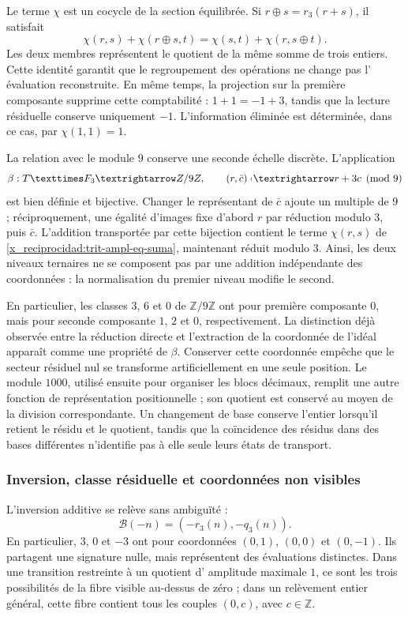 Le terme \(\chi\) est un cocycle de la section équilibrée. Si
\(r\oplus s=r_3(r+s)\), il satisfait
\[
 \chi(r,s)+\chi(r\oplus s,t)
 =\chi(s,t)+\chi(r,s\oplus t).
\]
Les deux membres représentent le quotient de la même somme de trois entiers.
Cette identité garantit que le regroupement des opérations ne change pas l'
évaluation reconstruite. En même temps, la projection sur la première
composante supprime cette comptabilité : \(1+1=-1+3\), tandis que la lecture
résiduelle conserve uniquement \(-1\). L'information éliminée est
déterminée, dans ce cas, par \(\chi(1,1)=1\).

La relation avec le module \(9\) conserve une seconde échelle discrète. L'application
\[
 \beta:\TRIT\times\mathbb F_3\longrightarrow\mathbb Z/9\mathbb Z,
 \qquad (r,\bar c)\longmapsto r+3c\pmod9
\]
est bien définie et bijective. Changer le représentant de \(\bar c\) ajoute un multiple de \(9\) ; réciproquement, une égalité d'images fixe d'abord \(r\) par réduction modulo \(3\), puis \(\bar c\). L'addition transportée par cette bijection contient le terme \(\chi(r,s)\) de \eqref{x_reciprocidad:trit-ampl-eq-suma}, maintenant réduit modulo \(3\). Ainsi, les deux niveaux ternaires ne se composent pas par une addition indépendante des coordonnées : la normalisation du premier niveau modifie le second.

En particulier, les classes \(3\), \(6\) et \(0\) de
\(\mathbb Z/9\mathbb Z\) ont pour première composante \(0\), mais pour seconde
composante \(1\), \(2\) et \(0\), respectivement. La distinction déjà observée
entre la réduction directe et l'extraction de la coordonnée de l'idéal apparaît
comme une propriété de \(\beta\). Conserver cette coordonnée empêche que le
secteur résiduel nul se transforme artificiellement en une seule position.
Le module \(1000\), utilisé ensuite pour organiser les blocs décimaux,
remplit une autre fonction de représentation positionnelle ; son quotient est conservé
au moyen de la division correspondante. Un changement de base conserve l'entier
lorsqu'il retient le résidu et le quotient, tandis que la coïncidence des résidus
dans des bases différentes n'identifie pas à elle seule leurs états de transport.

\subsubsection{Inversion, classe résiduelle et coordonnées non visibles}
\label{x_reciprocidad:trit-ampl-inversion}

L'inversion additive se relève sans ambiguïté :
\[
 \mathcal B(-n)=(-r_3(n),-q_3(n)).
\]
En particulier, \(3\), \(0\) et \(-3\) ont pour coordonnées
\((0,1)\), \((0,0)\) et \((0,-1)\). Ils partagent une signature nulle, mais représentent des
évaluations distinctes. Dans une transition restreinte à un quotient d'
amplitude maximale \(1\), ce sont les trois possibilités de la fibre visible au-dessus de
zéro ; dans un relèvement entier général, cette fibre contient tous les couples
\((0,c)\), avec \(c\in\mathbb Z\).

